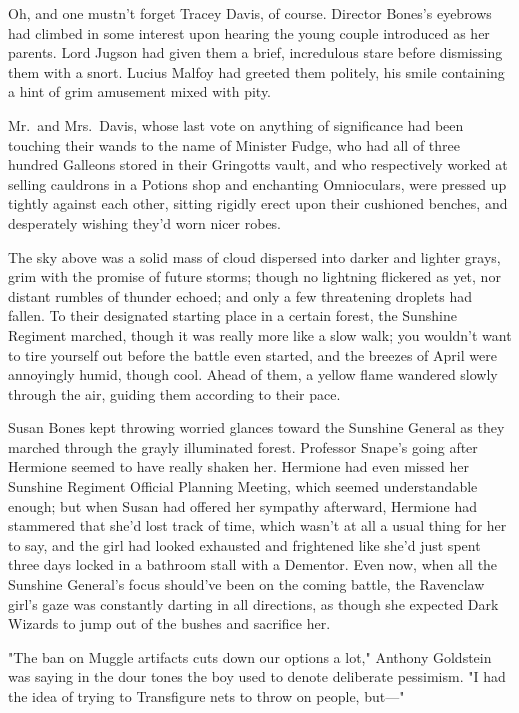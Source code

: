 Oh, and one mustn't forget Tracey Davis, of course. Director Bones's eyebrows 
had climbed in some interest upon hearing the young couple introduced as her 
parents. Lord Jugson had given them a brief, incredulous stare before 
dismissing them with a snort. Lucius Malfoy had greeted them politely, his 
smile containing a hint of grim amusement mixed with pity.

Mr.~and Mrs.~Davis, whose last vote on anything of significance had been 
touching their wands to the name of Minister Fudge, who had all of three 
hundred Galleons stored in their Gringotts vault, and who respectively worked 
at selling cauldrons in a Potions shop and enchanting Omnioculars, were pressed 
up tightly against each other, sitting rigidly erect upon their cushioned 
benches, and desperately wishing they'd worn nicer robes.

The sky above was a solid mass of cloud dispersed into darker and lighter 
grays, grim with the promise of future storms; though no lightning flickered as 
yet, nor distant rumbles of thunder echoed; and only a few threatening droplets 
had fallen.
\sbreak
To their designated starting place in a certain forest, the Sunshine Regiment 
marched, though it was really more like a slow walk; you wouldn't want to tire 
yourself out before the battle even started, and the breezes of April were 
annoyingly humid, though cool. Ahead of them, a yellow flame wandered slowly 
through the air, guiding them according to their pace.

Susan Bones kept throwing worried glances toward the Sunshine General as they 
marched through the grayly illuminated forest. Professor Snape's going after 
Hermione seemed to have really shaken her. Hermione had even missed her 
Sunshine Regiment Official Planning Meeting, which seemed understandable 
enough; but when Susan had offered her sympathy afterward, Hermione had 
stammered that she'd lost track of time, which wasn't at all a usual thing for 
her to say, and the girl had looked exhausted and frightened like she'd just 
spent three days locked in a bathroom stall with a Dementor. Even now, when all 
the Sunshine General's focus should've been on the coming battle, the Ravenclaw 
girl's gaze was constantly darting in all directions, as though she expected 
Dark Wizards to jump out of the bushes and sacrifice her.

"The ban on Muggle artifacts cuts down our options a lot," Anthony Goldstein 
was saying in the dour tones the boy used to denote deliberate pessimism. "I 
had the idea of trying to Transfigure nets to throw on people, but---"

